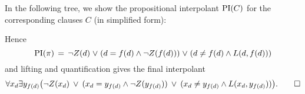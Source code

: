 \begin{exa}
{\begin{adjustwidth}{6.2em}{0em}
\begin{prooftree}
				\insertBetweenHyps{\hskip -10em}

				\RightLabelm{\resrule{\resruleres}{\id}}
				\BinaryInfCm{  \square }
			\end{prooftree}
		\end{adjustwidth}
		~

		~
	}

	In the following tree, we show the propositional interpolant $\operatorname{PI}(C)$ for the corresponding clauses $C$ (in simplified form):
	{
		\def\defaultHypSeparation{\hskip 4.4em}
		\begin{prooftree}

			\AxiomCm{ \top  }

			\AxiomCm{ \bot}
			\AxiomCm{ \top }

			\AxiomCm{ \bot}
			\AxiomCm{ \top }


			\AxiomCm{ \bot }


		\end{prooftree}
	}


	\noindent
	Hence
	\[\operatorname{PI}(\pi) \;\,{=}\;\,  \lnot Z(d) \;{\lor}\;  (d = f(d) \land \lnot Z(f(d)) ) \;{\lor}\; (d \neq f(d) \land L(d, f(d))) \]
	and lifting and quantification gives the final interpolant
	\[ \forall x_d \exists y_{f(d)} \big( \lnot Z(x_d) \;\,{\lor}\;\,  (x_d = y_{f(d)} \land \lnot Z(y_{f(d)}) ) \;\,{\lor}\;\, (x_d \neq y_{f(d)} \land L(x_d, y_{f(d)})) \big).
	\qedhere
\]
\end{exa}






